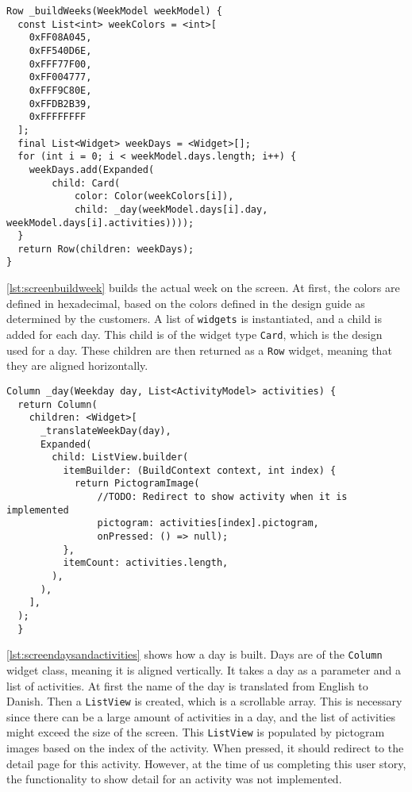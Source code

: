 \begin{lstlisting}[caption={Building the week},label={lst:screenbuildweek}]
  Row _buildWeeks(WeekModel weekModel) {
  const List<int> weekColors = <int>[
    0xFF08A045,
    0xFF540D6E,
    0xFFF77F00,
    0xFF004777,
    0xFFF9C80E,
    0xFFDB2B39,
    0xFFFFFFFF
  ];
  final List<Widget> weekDays = <Widget>[];
  for (int i = 0; i < weekModel.days.length; i++) {
    weekDays.add(Expanded(
        child: Card(
            color: Color(weekColors[i]),
            child: _day(weekModel.days[i].day, weekModel.days[i].activities))));
  }
  return Row(children: weekDays);
}
\end{lstlisting}
\autoref{lst:screenbuildweek} builds the actual week on the screen.
At first, the colors are defined in hexadecimal, based on the colors defined in the design guide as determined by the customers.
A list of \texttt{widgets} is instantiated, and a child is added for each day.
This child is of the widget type \texttt{Card}, which is the design used for a day.
These children are then returned as a \texttt{Row} widget, meaning that they are aligned horizontally.

\begin{lstlisting}[caption={Building days and activities},label={lst:screendaysandactivities}]
  Column _day(Weekday day, List<ActivityModel> activities) {
  return Column(
    children: <Widget>[
      _translateWeekDay(day),
      Expanded(
        child: ListView.builder(
          itemBuilder: (BuildContext context, int index) {
            return PictogramImage(
                //TODO: Redirect to show activity when it is implemented
                pictogram: activities[index].pictogram,
                onPressed: () => null);
          },
          itemCount: activities.length,
        ),
      ),
    ],
  );
  }
\end{lstlisting}
\autoref{lst:screendaysandactivities} shows how a day is built.
Days are of the \texttt{Column} widget class, meaning it is aligned vertically.
It takes a day as a parameter and a list of activities.
At first the name of the day is translated from English to Danish.
Then a \texttt{ListView} is created, which is a scrollable array. 
This is necessary since there can be a large amount of activities in a day, and the list of activities might exceed the size of the screen.
This \texttt{ListView} is populated by pictogram images based on the index of the activity.
When pressed, it should redirect to the detail page for this activity.
However, at the time of us completing this user story, the functionality to show detail for an activity was not implemented.


